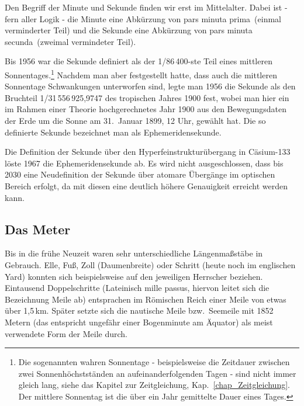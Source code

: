 Den Begriff der Minute und Sekunde finden wir erst im Mittelalter. 
Dabei ist - fern aller Logik - die Minute 
eine Abk\"urzung von \glqq pars minuta prima\grqq\ (einmal verminderter Teil) und die Sekunde eine
Abk\"urzung von \glqq pars minuta secunda\grqq\ (zweimal vermindeter Teil). 

Bis 1956 war die Sekunde definiert als der 1/86\,400-ste Teil eines 
mittleren 
Sonnentages.\footnote{Die sogenannten wahren
Sonnentage - beispielsweise die Zeitdauer zwischen zwei Sonnenh\"ochstst\"anden an aufeinanderfolgenden
Tagen - sind nicht immer gleich lang, siehe das Kapitel zur Zeitgleichung, Kap.\ \ref{chap_Zeitgleichung}.
Der mittlere Sonnentag ist die \"uber ein Jahr gemittelte Dauer eines Tages.} 
Nachdem man aber festgestellt hatte, dass auch die mittleren Sonnentage Schwankungen
unterworfen sind, legte man 1956 die Sekunde als den Bruchteil 1/31\,556\,925,9747
des tropischen Jahres 1900 fest, wobei
man hier ein im Rahmen einer Theorie hochgerechnetes Jahr 1900 aus den Bewegungsdaten der Erde um die
Sonne am 31.\ Januar 1899, 12 Uhr, gew\"ahlt hat. Die so definierte Sekunde bezeichnet man
als Ephemeridensekunde. 

Die Definition der Sekunde \"uber den Hyperfeinstruktur\"ubergang in C\"asium-133 l\"oste 1967 die 
Ephemeridensekunde ab. Es wird nicht ausgeschlossen, dass bis 2030
eine Neudefinition der Sekunde \"uber atomare \"Uberg\"ange im optischen Bereich erfolgt, da mit 
diesen eine deutlich h\"ohere Genauigkeit erreicht werden kann.

\subsection{Das Meter}

Bis in die fr\"uhe Neuzeit waren sehr unterschiedliche L\"angenma\ss st\"abe in Gebrauch. 
Elle, Fu\ss, Zoll (Daumenbreite) oder Schritt (heute noch im englischen Yard) konnten sich 
beispielsweise auf den jeweiligen Herrscher beziehen. Eintausend Doppelschritte (Lateinisch
\glqq mille passus\grqq, hiervon leitet sich die Bezeichnung Meile ab) 
entsprachen im R\"omischen
Reich einer Meile von etwas \"uber 1,5\,km. Sp\"ater setzte sich die nautische Meile bzw.\ Seemeile
mit 1852 Metern (das entspricht ungef\"ahr einer Bogenminute am \"Aquator) als meist verwendete
Form der Meile durch. 

